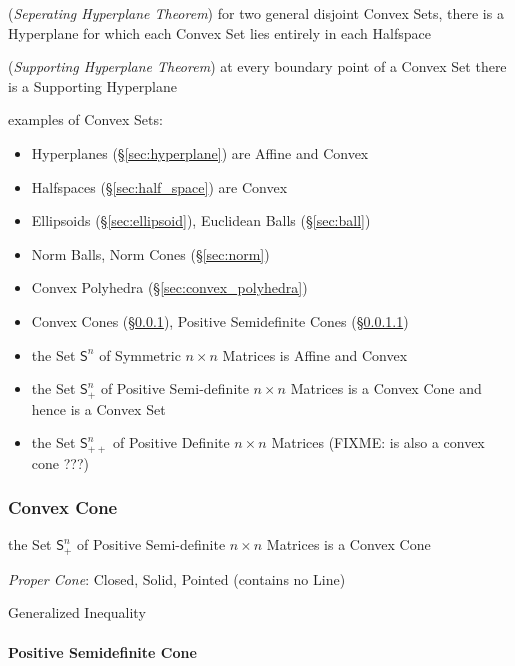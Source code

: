 {(\emph{Seperating Hyperplane Theorem}) for two general disjoint Convex Sets,
there is a Hyperplane for which each Convex Set lies entirely in each Halfspace

(\emph{Supporting Hyperplane Theorem}) at every boundary point of a Convex Set
there is a Supporting Hyperplane

examples of Convex Sets:
\begin{itemize}
  \item Hyperplanes (\S\ref{sec:hyperplane}) are Affine and Convex
  \item Halfspaces (\S\ref{sec:half_space}) are Convex
  \item Ellipsoids (\S\ref{sec:ellipsoid}), Euclidean Balls (\S\ref{sec:ball})
  \item Norm Balls, Norm Cones (\S\ref{sec:norm})
  \item Convex Polyhedra (\S\ref{sec:convex_polyhedra})
  \item Convex Cones (\S\ref{sec:convex_cone}), Positive Semidefinite Cones
    (\S\ref{sec:positive_semidefinite_cone})
  \item the Set $\mathsf{S}^n$ of Symmetric $n \times n$ Matrices is Affine and
    Convex
  \item the Set $\mathsf{S}_+^n$ of Positive Semi-definite $n \times n$
    Matrices is a Convex Cone and hence is a Convex Set
  \item the Set $\mathsf{S}_{++}^n$ of Positive Definite $n \times n$ Matrices
    (FIXME: is also a convex cone ???)
\end{itemize}



\subsubsection{Convex Cone}\label{sec:convex_cone}

the Set $\mathsf{S}_+^n$ of Positive Semi-definite $n \times n$ Matrices is a
Convex Cone

\emph{Proper Cone}: Closed, Solid, Pointed (contains no Line)

Generalized Inequality



\paragraph{Positive Semidefinite Cone}
\label{sec:positive_semidefinite_cone}\hfill



}
